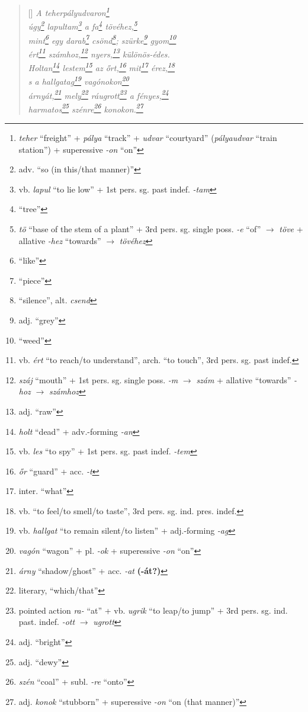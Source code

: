 \documentclass[a4paper,12pt,twoside,final]{book}
\begin{document}
\begin{verse}[\versewidth]
  \it
  A teherpályudvaron\footnote{\emph{teher} ``freight'' + \emph{pálya}
  ``track'' + \emph{udvar} ``courtyard'' (\emph{pályaudvar} ``train
  station'') + superessive \emph{-on} ``on''} \\
  úgy\footnote{adv. ``so (in this/that manner)''}
  lapultam\footnote{vb. \emph{lapul} ``to lie low''
  + 1st pers. sg. past indef. \emph{-tam}} a
  fa\footnote{``tree''} tövéhez,\footnote{\emph{tö} ``base of the stem
  of a plant'' + 3rd pers. sg. single poss. \emph{-e} ``of''
  $\rightarrow$ \emph{töve} + allative \emph{-hez} ``towards''
  $\rightarrow$ \emph{tövéhez}} \\
  mint\footnote{``like''} egy darab\footnote{``piece''}
  csönd\footnote{``silence'', alt. \emph{csend}};
  szürke\footnote{adj. ``grey''} gyom\footnote{``weed''} \\
  ért\footnote{vb. \emph{ért} ``to reach/to understand'',
  arch. ``to touch'', 3rd pers. sg. past indef.}
  számhoz,\footnote{\emph{száj} ``mouth'' + 1st
  pers. sg. single poss. \emph{-m} $\rightarrow$ \emph{szám} +
  allative ``towards'' \emph{-hoz} $\rightarrow$ \emph{számhoz}}
  nyers,\footnote{adj. ``raw''} különös-édes. \\
  Holtan\footnote{\emph{holt} ``dead'' + adv.-forming \emph{-an}}
  lestem\footnote{vb. \emph{les} ``to spy'' + 1st
  pers. sg. past indef. \emph{-tem}} az őrt,\footnote{\emph{őr} ``guard'' +
  acc. \emph{-t}} mit\footnote{inter. ``what''}
  érez,\footnote{vb. ``to feel/to smell/to taste'',
  3rd pers. sg. ind. pres. indef.} \\
  s a hallgatag\footnote{vb. \emph{hallgat} ``to remain silent/to
  listen'' + adj.-forming \emph{-ag}} vagónokon\footnote{\emph{vagón}
  ``wagon'' + pl. \emph{-ok} + superessive \emph{-on} ``on''} \\
  árnyát,\footnote{\emph{árny} ``shadow/ghost'' +
  acc. \emph{-at} \textbf{(-át?)}} mely\footnote{literary,
  ``which/that''} ráugrott\footnote{pointed action \emph{ra-} ``at'' +
  vb. \emph{ugrik} ``to leap/to jump'' + 3rd
  pers. sg. ind. past. indef. \emph{-ott} $\rightarrow$ \emph{ugrott}} a
  fényes,\footnote{adj. ``bright''} \\
  harmatos\footnote{adj. ``dewy''} szénre\footnote{\emph{szén}
  ``coal'' + subl. \emph{-re} ``onto''}
  konokon.\footnote{adj. \emph{konok} ``stubborn'' +
  superessive \emph{-on} ``on (that manner)''}
\end{verse}

\newpage
\end{document}
